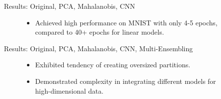 \documentclass[10pt, aspectratio=169]{beamer}
\begin{document}
\begin{frame}{Results: \textcolor{MyOriginal}{Original}, \textcolor{MyPca}{PCA}, \textcolor{MyMahalanobis}{Mahalanobis}, \textcolor{MyCnn}{CNN}}
\begin{figure}[h]
    \centering    
    \begin{subfigure}[b]{0.45\textwidth}
        \centering
    \end{subfigure}
    \hspace{2mm}
    \begin{subfigure}[b]{0.45\textwidth}
        \centering
    \end{subfigure}
    
    \begin{itemize}
    	\item Achieved high performance on MNIST with only 4-5 epochs, compared to 40+ epochs for linear models.
    \end{itemize}
    
\end{figure}

\end{frame}

\begin{frame}{Results: \textcolor{MyOriginal}{Original}, \textcolor{MyPca}{PCA}, \textcolor{MyMahalanobis}{Mahalanobis}, \textcolor{MyCnn}{CNN}, \textcolor{MyEnsembling}{Multi-Ensembling}}
\begin{figure}[h]
    \centering    
    \begin{subfigure}[b]{0.45\textwidth}
        \centering
    \end{subfigure}
    \hspace{2mm}
    \begin{subfigure}[b]{0.45\textwidth}
        \centering
    \end{subfigure}
    
    \begin{itemize}
        \item Exhibited tendency of creating oversized partitions.
    	\item Demonstrated complexity in integrating different models for high-dimensional data.
    \end{itemize}
    
\end{figure}

\end{frame}
\end{document}
